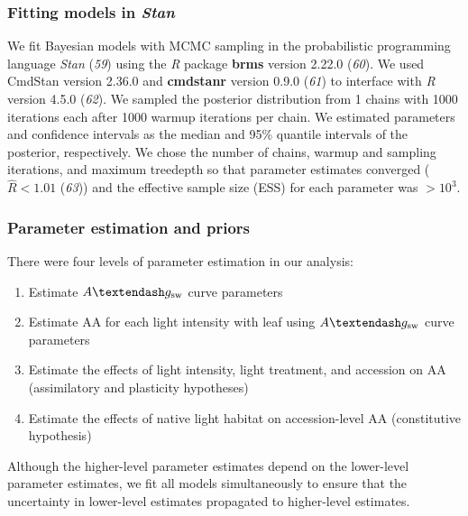 \documentclass[
  letterpaper,
  DIV=11,
  numbers=noendperiod]{scrartcl}
\providecommand{\tightlist}{%
  \setlength{\itemsep}{0pt}\setlength{\parskip}{0pt}}\usepackage{longtable,booktabs,array}
\newcommand{\aax}{$\mathrm{AA}$}
\newcommand{\agcurve}{$A \textendash g_\text{sw}$}
\begin{document}
\subsubsection{\texorpdfstring{Fitting models in
\emph{Stan}}{Fitting models in Stan}}\label{sec-fitting}

We fit Bayesian models with MCMC sampling in the probabilistic
programming language \emph{Stan} (\emph{59}) using the \emph{R} package
\textbf{brms} version 2.22.0 (\emph{60}). We used CmdStan version 2.36.0
and \textbf{cmdstanr} version 0.9.0 (\emph{61}) to interface with
\emph{R} version 4.5.0 (\emph{62}). We sampled the posterior
distribution from 1 chains with 1000 iterations each after 1000 warmup
iterations per chain. We estimated parameters and confidence intervals
as the median and 95\% quantile intervals of the posterior,
respectively. We chose the number of chains, warmup and sampling
iterations, and maximum treedepth so that parameter estimates converged
(\(\hat{R} < 1.01\) (\emph{63})) and the effective sample size (ESS) for
each parameter was \(> 10^3\).

\subsubsection{Parameter estimation and priors}\label{sec-parameters}

There were four levels of parameter estimation in our analysis:

\begin{enumerate}
\def\labelenumi{\arabic{enumi}.}
\tightlist
\item
  Estimate \agcurve{} curve parameters
\item
  Estimate \aax{} for each light intensity with leaf using \agcurve{}
  curve parameters
\item
  Estimate the effects of light intensity, light treatment, and
  accession on \aax{} (assimilatory and plasticity hypotheses)
\item
  Estimate the effects of native light habitat on accession-level \aax{}
  (constitutive hypothesis)
\end{enumerate}

Although the higher-level parameter estimates depend on the lower-level
parameter estimates, we fit all models simultaneously to ensure that the
uncertainty in lower-level estimates propagated to higher-level
estimates.
\end{document}

